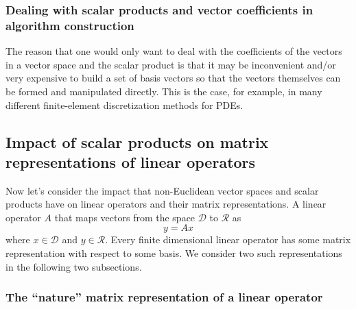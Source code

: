 \subsubsection{Dealing with scalar products and vector coefficients in algorithm construction}

The reason that one would only want to deal with the coefficients of the
vectors in a vector space and the scalar product is that it may be
inconvenient and/or very expensive to build a set of basis vectors so that the
vectors themselves can be formed and manipulated directly.  This is the case,
for example, in many different finite-element discretization methods for PDEs.

\subsection{Impact of scalar products on matrix representations of linear operators}
\label{sec:matrix_representations_of_linear_operators}

Now let's consider the impact that non-Euclidean vector spaces and scalar
products have on linear operators and their matrix representations.  A linear
operator $A$ that maps vectors from the space $\mathcal{D}$ to $\mathcal{R}$
as
%
\begin{equation}
y = A x
\label{eqn:fwd_op_apply}
\end{equation}
%
where $x\in\mathcal{D}$ and $y\in\mathcal{R}$.  Every finite dimensional
linear operator has some matrix representation with respect to some basis.
We consider two such representations in the following two subsections.

\subsubsection{The ``nature'' matrix representation of a linear operator}

